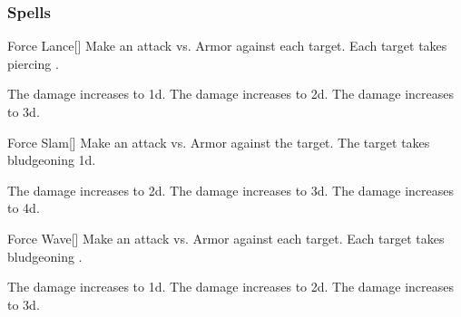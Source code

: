 \subsubsection{Spells}


\lowercase{\hypertarget{spell:Force Lance}{}}\label{spell:Force Lance}
\begin{freeability}[Rank 1]{\hypertarget{spell:Force Lance}{Force Lance}}[]
Make an attack vs. Armor against each target.
\hit Each target takes piercing .

\rankline
{} The damage increases to  \plus1d.
 The damage increases to  \plus2d.
 The damage increases to  \plus3d.
\end{freeability}
\vspace{0.25em}



\lowercase{\hypertarget{spell:Force Slam}{}}\label{spell:Force Slam}
\begin{freeability}[Rank 1]{\hypertarget{spell:Force Slam}{Force Slam}}[]
Make an attack vs. Armor against the target.
\hit The target takes bludgeoning  \plus1d.

\rankline
{} The damage increases to  \plus2d.
 The damage increases to  \plus3d.
 The damage increases to  \plus4d.
\end{freeability}
\vspace{0.25em}



\lowercase{\hypertarget{spell:Force Wave}{}}\label{spell:Force Wave}
\begin{freeability}[Rank 1]{\hypertarget{spell:Force Wave}{Force Wave}}[]
Make an attack vs. Armor against each target.
\hit Each target takes bludgeoning .

\rankline
{} The damage increases to  \plus1d.
 The damage increases to  \plus2d.
 The damage increases to  \plus3d.
\end{freeability}
\vspace{0.25em}



